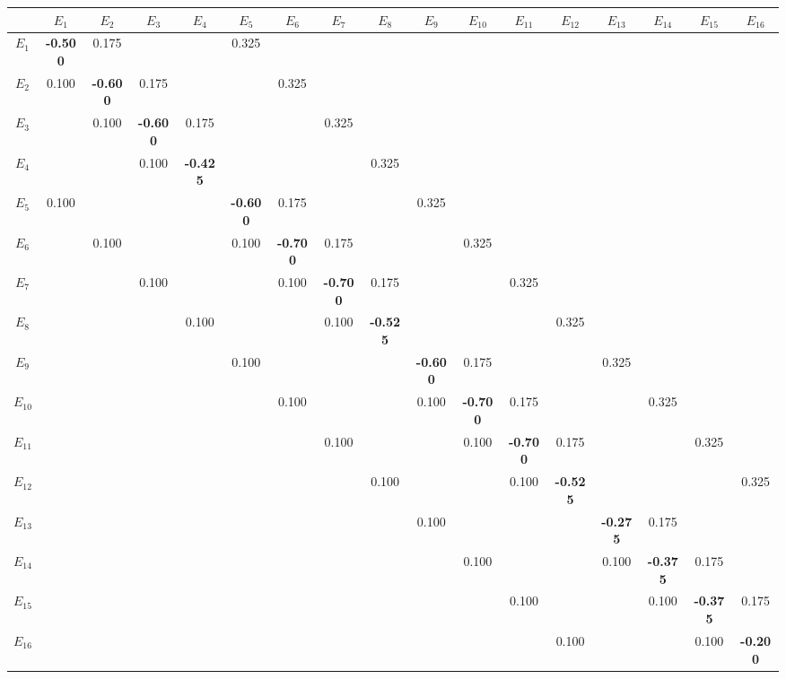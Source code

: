\begin{tabular}{c|cccccccccccccccc}
 & $E_{1}$ & $E_{2}$ & $E_{3}$ & $E_{4}$ & $E_{5}$ & $E_{6}$ & $E_{7}$ & $E_{8}$ & $E_{9}$ & $E_{10}$ & $E_{11}$ & $E_{12}$ & $E_{13}$ & $E_{14}$ & $E_{15}$ & $E_{16}$ \\ \hline
$E_{1}$ & \textbf{-0.500} & 0.175 &  &  & 0.325 &  &  &  &  &  &  &  &  &  &  &  \\
$E_{2}$ & 0.100 & \textbf{-0.600} & 0.175 &  &  & 0.325 &  &  &  &  &  &  &  &  &  &  \\
$E_{3}$ &  & 0.100 & \textbf{-0.600} & 0.175 &  &  & 0.325 &  &  &  &  &  &  &  &  &  \\
$E_{4}$ &  &  & 0.100 & \textbf{-0.425} &  &  &  & 0.325 &  &  &  &  &  &  &  &  \\
$E_{5}$ & 0.100 &  &  &  & \textbf{-0.600} & 0.175 &  &  & 0.325 &  &  &  &  &  &  &  \\
$E_{6}$ &  & 0.100 &  &  & 0.100 & \textbf{-0.700} & 0.175 &  &  & 0.325 &  &  &  &  &  &  \\
$E_{7}$ &  &  & 0.100 &  &  & 0.100 & \textbf{-0.700} & 0.175 &  &  & 0.325 &  &  &  &  &  \\
$E_{8}$ &  &  &  & 0.100 &  &  & 0.100 & \textbf{-0.525} &  &  &  & 0.325 &  &  &  &  \\
$E_{9}$ &  &  &  &  & 0.100 &  &  &  & \textbf{-0.600} & 0.175 &  &  & 0.325 &  &  &  \\
$E_{10}$ &  &  &  &  &  & 0.100 &  &  & 0.100 & \textbf{-0.700} & 0.175 &  &  & 0.325 &  &  \\
$E_{11}$ &  &  &  &  &  &  & 0.100 &  &  & 0.100 & \textbf{-0.700} & 0.175 &  &  & 0.325 &  \\
$E_{12}$ &  &  &  &  &  &  &  & 0.100 &  &  & 0.100 & \textbf{-0.525} &  &  &  & 0.325 \\
$E_{13}$ &  &  &  &  &  &  &  &  & 0.100 &  &  &  & \textbf{-0.275} & 0.175 &  &  \\
$E_{14}$ &  &  &  &  &  &  &  &  &  & 0.100 &  &  & 0.100 & \textbf{-0.375} & 0.175 &  \\
$E_{15}$ &  &  &  &  &  &  &  &  &  &  & 0.100 &  &  & 0.100 & \textbf{-0.375} & 0.175 \\
$E_{16}$ &  &  &  &  &  &  &  &  &  &  &  & 0.100 &  &  & 0.100 & \textbf{-0.200} \\
\end{tabular}